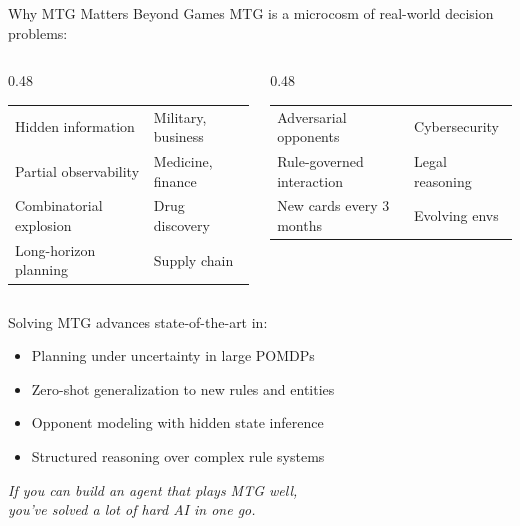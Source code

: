 \documentclass[aspectratio=169, 11pt]{beamer}
\begin{document}
\begin{frame}{Why MTG Matters Beyond Games}
  MTG is a microcosm of real-world decision problems:
  \vspace{0.3cm}
  \begin{columns}[T]
    \begin{column}{0.48\textwidth}
      \footnotesize
      \begin{tabular}{@{}ll@{}}
        Hidden information         & Military, business \\
        Partial observability      & Medicine, finance \\
        Combinatorial explosion    & Drug discovery \\
        Long-horizon planning      & Supply chain \\
      \end{tabular}
    \end{column}
    \begin{column}{0.48\textwidth}
      \footnotesize
      \begin{tabular}{@{}ll@{}}
        Adversarial opponents    & Cybersecurity \\
        Rule-governed interaction & Legal reasoning \\
        New cards every 3 months  & Evolving envs \\
      \end{tabular}
    \end{column}
  \end{columns}
  \vspace{0.5cm}
  Solving MTG advances state-of-the-art in:
  \begin{itemize}
    \item Planning under uncertainty in large POMDPs
    \item Zero-shot generalization to new rules and entities
    \item Opponent modeling with hidden state inference
    \item Structured reasoning over complex rule systems
  \end{itemize}
  \vspace{0.3cm}
  \begin{center}
    \textit{If you can build an agent that plays MTG well,\\
    you've solved a lot of hard AI in one go.}
  \end{center}
\end{frame}
\end{document}
